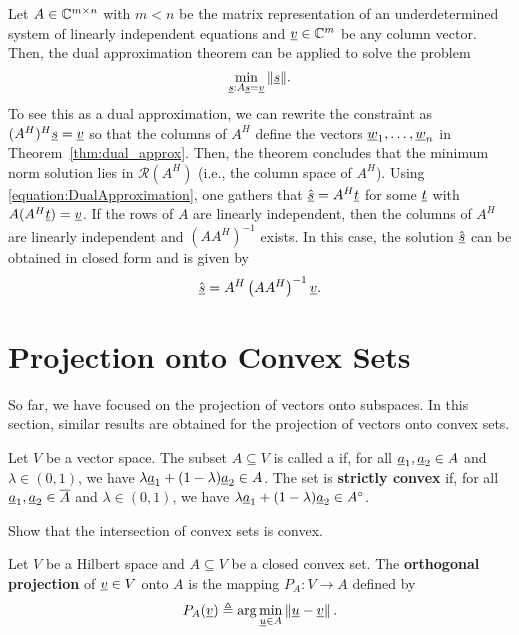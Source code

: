 Let $A \in \mathbb{C}^{m\times n}$ with $m<n$ be the matrix representation of an underdetermined system of linearly independent equations and $\underline{v} \in \mathbb{C}^m$ be any column vector.
Then, the dual approximation theorem can be applied to solve the problem
\[ \min_{\underline{s} : A\underline{s} = \underline{v}} \| \underline{s} \| . \]
To see this as a dual approximation, we can rewrite the constraint as $(A^H)^H \underline{s} = \underline{v}$ so that the columns of $A^H$ define the vectors $\underline{w}_1,\ldots,\underline{w}_n$ in Theorem~\ref{thm:dual_approx}.
Then, the theorem concludes that the minimum norm solution lies in $\mathcal{R}(A^H)$ (i.e., the column space of $A^H$).
Using \eqref{equation:DualApproximation}, one gathers that $\hat{\underline{s}} = A^H \underline{t}$ for some $\underline{t}$ with $A (A^H \underline{t}) = \underline{v}$.
If the rows of $A$ are linearly independent, then the columns of $A^H$ are linearly independent and $(A A^H)^{-1}$ exists.
In this case, the solution $\hat{\underline{s}}$ can be obtained in closed form and is given by
\[ \hat{\underline{s}} = A^H \left( A A^H \right)^{-1} \underline{v}. \]


\section{Projection onto Convex Sets}

So far, we have focused on the projection of vectors onto subspaces.
In this section, similar results are obtained for the projection of vectors onto convex sets.

\begin{definition}
Let $V$ be a vector space.
The subset $A \subseteq V$ is called a  if, for all $\underline{a}_1,\underline{a}_2 \in A$ and $\lambda\in(0,1)$, we have $\lambda \underline{a}_1 + (1-\lambda) \underline{a}_2 \in A$.
The set is \textbf{strictly convex} if, for all $\underline{a}_1,\underline{a}_2 \in \overline{A}$ and $\lambda\in(0,1)$, we have $\lambda \underline{a}_1 + (1-\lambda) \underline{a}_2 \in {A}^{\circ}$.
\end{definition}

\begin{problem}
Show that the intersection of convex sets is convex.
\end{problem}

\begin{definition}
Let $V$ be a Hilbert space and $A\subseteq V$ be a closed convex set. The \textbf{orthogonal projection} of $\underline{v} \in V$ onto $A$ is the mapping $P_A \colon V \to A$ defined by
\[
P_A (\underline{v}) \triangleq \arg \min_{\underline u\in A}\left\Vert \underline u-\underline v\right\Vert. 
\]
\end{definition}


